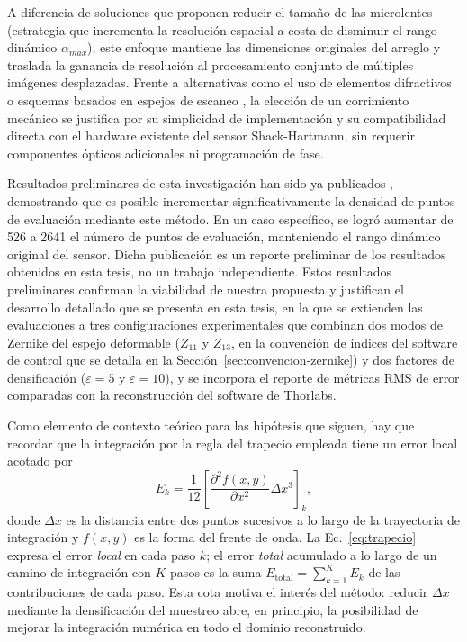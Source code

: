 \documentclass[letterpaper,12pt,oneside]{book}
\makeatletter
\renewcommand\section{\@startsection{section}{1}{\z@}{-3.5ex \@plus -1ex \@minus -.2ex}{2.3ex \@plus.2ex}{\normalfont\Large\bfseries\raggedright}}
\makeatother
\begin{document}
A diferencia de soluciones que proponen reducir el tamaño de las microlentes (estrategia
que incrementa la resolución espacial a costa de disminuir el rango dinámico
$\alpha_{max}$), este enfoque mantiene las dimensiones originales del arreglo y traslada
la ganancia de resolución al procesamiento conjunto de múltiples imágenes desplazadas.
Frente a alternativas como el uso de elementos difractivos \cite{GuoScanning,ZhangSLM} o
esquemas basados en espejos de escaneo \cite{ScanningAberrometer,FuerstDivergent}, la
elección de un corrimiento mecánico se justifica por su simplicidad de implementación y su
compatibilidad directa con el hardware existente del sensor Shack-Hartmann, sin requerir
componentes ópticos adicionales ni programación de fase.

Resultados preliminares de esta investigación han sido ya publicados \cite{SHWS_scan},
demostrando que es posible incrementar significativamente la densidad de puntos de
evaluación mediante este método. En un caso específico, se logró aumentar de 526 a 2641 el
número de puntos de evaluación, manteniendo el rango dinámico original del sensor. Dicha
publicación es un reporte preliminar de los resultados obtenidos en esta tesis, no un
trabajo independiente. Estos resultados preliminares confirman la viabilidad de nuestra
propuesta y justifican el desarrollo detallado que se presenta en esta tesis, en la que se
extienden las evaluaciones a tres configuraciones experimentales que combinan dos modos de
Zernike del espejo deformable ($Z_{11}$ y $Z_{13}$, en la convención de índices del
software de control que se detalla en la Sección~\ref{sec:convencion-zernike}) y dos
factores de densificación ($\varepsilon = 5$ y $\varepsilon = 10$), y se incorpora el
reporte de métricas RMS de error comparadas con la reconstrucción del software de
Thorlabs.

\section{Hipótesis y objetivos}

Como elemento de contexto teórico para las hipótesis que siguen, hay que recordar que la integración por la regla del trapecio empleada tiene un error local acotado \cite{Chapra} por
\begin{equation}
E_k= \frac{1}{12}\left[\frac{\partial^2 f(x,y)}{\partial x^2}\Delta x^3\right]_k,
\label{eq:trapecio}
\end{equation}
donde $\Delta x$ es la distancia entre dos puntos sucesivos a lo largo de la trayectoria de integración y $f(x,y)$ es la forma del frente de onda. La Ec.~\ref{eq:trapecio} expresa el error \emph{local} en cada paso $k$; el error \emph{total} acumulado a lo largo de un camino de integración con $K$ pasos es la suma $E_{\text{total}} = \sum_{k=1}^{K} E_k$ de las contribuciones de cada paso. Esta cota motiva el interés del método: reducir $\Delta x$ mediante la densificación del muestreo abre, en principio, la posibilidad de mejorar la integración numérica en todo el dominio reconstruido.
\end{document}
